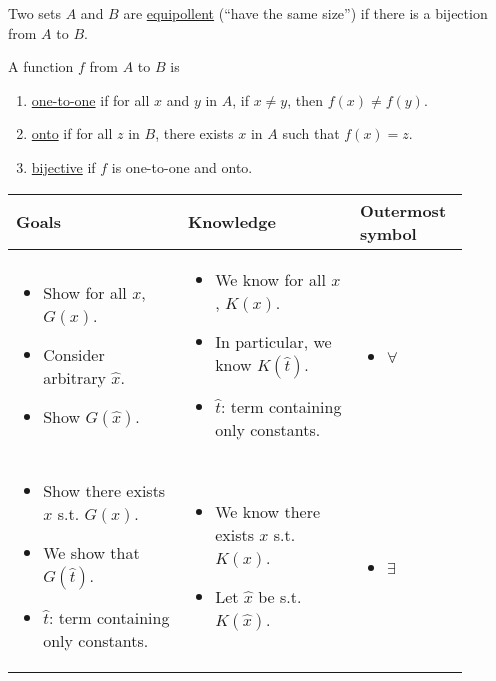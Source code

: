 {{\begin{definition}
  Two sets $A$ and $B$ are \underline{equipollent} (``have the same 
  size'') if there is a bijection from $A$ to $B$.
\end{definition}

\begin{definition}
  A function $f$ from $A$ to $B$ is 
  \begin{enumerate}
    \item \underline{one-to-one} if for all $x$ and $y$ in $A$, if 
    $x \neq y$, then $f(x) \neq f(y)$.
    \item \underline{onto} if for all $z$ in $B$, there exists $x$ 
    in $A$ such that $f(x) = z$.
    \item \underline{bijective} if $f$ is one-to-one and onto.
  \end{enumerate}
\end{definition}

\begin{center}
\begin{tabular}{
  p{0.35\linewidth} | p{0.35\linewidth} | p{0.2\linewidth}}
  Goals & Knowledge & Outermost symbol \\
  \hline
  \begin{itemize}[leftmargin=*]
    \item[] Show for all $x$, $G(x)$.
    \item[] Consider arbitrary $\hat{x}$.
    \item[] Show $G(\hat{x})$. 
  \end{itemize} & \begin{itemize}[leftmargin=*]
    \item[] We know for all $x$, $K(x)$.
    \item[] In particular, we know $K(\hat{t})$.
    \item[] $\hat{t}$: term containing only constants. 
  \end{itemize} & \begin{itemize}
    \item[] \Large $\forall$
  \end{itemize} \\ 
  \hline 
  \begin{itemize}[leftmargin=*]
    \item[] Show there exists $x$ s.t. $G(x)$.
    \item[] We show that $G(\hat{t})$.
    \item[] $\hat{t}$: term containing only constants.
  \end{itemize} & \begin{itemize}[leftmargin=*]
    \item[] We know there exists $x$ s.t. $K(x)$.
    \item[] Let $\hat{x}$ be s.t. $K(\hat{x})$.
  \end{itemize} & \begin{itemize}
    \item[] \Large $\exists$
  \end{itemize}
\end{tabular}
\end{center}

}} %
